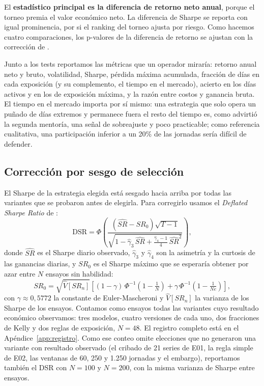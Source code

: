 \documentclass[11pt,a4paper]{article}
\begin{document}
El \textbf{estadístico principal es la diferencia de retorno neto anual}, porque el torneo premia el valor económico neto. La diferencia de Sharpe se reporta con igual prominencia, por si el ranking del torneo ajusta por riesgo. Como hacemos cuatro comparaciones, los p-valores de la diferencia de retorno se ajustan con la corrección de \citet{holm1979}.

Junto a los tests reportamos las métricas que un operador miraría: retorno anual neto y bruto, volatilidad, Sharpe, pérdida máxima acumulada, fracción de días en cada exposición (y su complemento, el tiempo en el mercado), acierto en los días activos y en los de exposición máxima, y la razón entre costos y ganancia bruta. El tiempo en el mercado importa por sí mismo: una estrategia que solo opera un puñado de días extremos y permanece fuera el resto del tiempo es, como advirtió la segunda mentoría, una señal de sobreajuste y poco practicable; como referencia cualitativa, una participación inferior a un 20\% de las jornadas sería difícil de defender.

\subsection{Corrección por sesgo de selección}

El Sharpe de la estrategia elegida está sesgado hacia arriba por todas las variantes que se probaron antes de elegirla. Para corregirlo usamos el \emph{Deflated Sharpe Ratio} de \citet{bailey2014}:
\begin{equation}\label{eq:dsr}
\text{DSR}=\Phi\!\left(\frac{(\widehat{SR}-SR_0)\sqrt{T-1}}{\sqrt{1-\hat\gamma_3\,\widehat{SR}+\frac{\hat\gamma_4-1}{4}\,\widehat{SR}^2}}\right),
\end{equation}
donde \(\widehat{SR}\) es el Sharpe diario observado, \(\hat\gamma_3\) y \(\hat\gamma_4\) son la asimetría y la curtosis de las ganancias diarias, y \(SR_0\) es el Sharpe máximo que se esperaría obtener por azar entre \(N\) ensayos sin habilidad:
\begin{equation}\label{eq:sr0}
SR_0=\sqrt{\widehat{V}[SR_n]}\left[(1-\gamma)\,\Phi^{-1}\!\left(1-\tfrac1N\right)+\gamma\,\Phi^{-1}\!\left(1-\tfrac{1}{Ne}\right)\right],
\end{equation}
con \(\gamma\approx0{,}5772\) la constante de Euler-Mascheroni y \(\widehat{V}[SR_n]\) la varianza de los Sharpe de los ensayos. Contamos como ensayos todas las variantes cuyo resultado económico observamos: tres modelos, cuatro versiones de cada uno, dos fracciones de Kelly y dos reglas de exposición, \(N=48\). El registro completo está en el Apéndice~\ref{app:registro}. Como ese conteo omite elecciones que no generaron una variante con resultado observado (el cribado de 21 series de E01, la regla simple de E02, las ventanas de 60, 250 y 1.250 jornadas y el embargo), reportamos también el DSR con \(N=100\) y \(N=200\), con la misma varianza de Sharpe entre ensayos.
\end{document}
